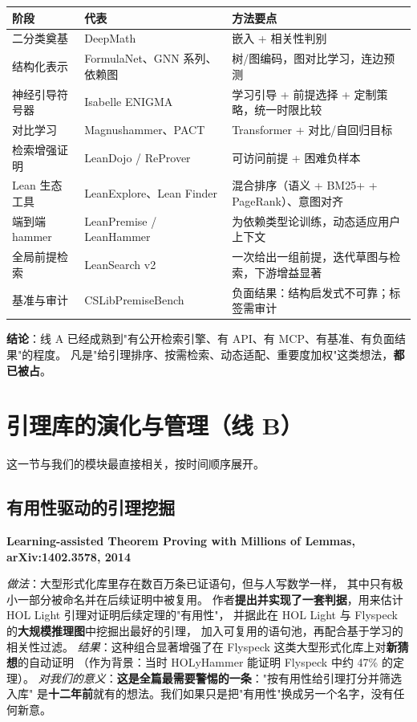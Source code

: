 \documentclass[UTF8,a4paper,11pt,fontset=windows]{ctexart}
\newcommand{\paper}[1]{\par\medskip\noindent\textbf{\color{sgblue!80!black}#1}\par\nobreak\vspace{1pt}}
\newcommand{\field}[1]{\textit{#1}：}
\begin{document}
\begin{table}[htbp]
\centering
\footnotesize
\begin{tabularx}{\textwidth}{@{}p{3.5cm}p{4.2cm}Y@{}}
\toprule
\textbf{阶段} & \textbf{代表} & \textbf{方法要点} \\
\midrule
二分类奠基 & DeepMath & 嵌入 + 相关性判别 \\
\midrule
结构化表示 & FormulaNet、GNN 系列、依赖图 & 树/图编码，图对比学习，连边预测 \\
\midrule
神经引导符号器 & Isabelle ENIGMA & 学习引导 + 前提选择 + 定制策略，统一时限比较 \\
\midrule
对比学习 & Magnushammer、PACT & Transformer + 对比/自回归目标 \\
\midrule
检索增强证明 & LeanDojo / ReProver & 可访问前提 + 困难负样本 \\
\midrule
Lean 生态工具 & LeanExplore、Lean Finder & 混合排序（语义 + BM25+ + PageRank）、意图对齐 \\
\midrule
端到端 hammer & LeanPremise / LeanHammer & 为依赖类型论训练，动态适应用户上下文 \\
\midrule
全局前提检索 & LeanSearch v2 & 一次给出一组前提，迭代草图与检索，下游增益显著 \\
\midrule
基准与审计 & CSLibPremiseBench & 负面结果：结构启发式不可靠；标签需审计 \\
\bottomrule
\end{tabularx}
\end{table}

\textbf{结论}：线 A 已经成熟到"有公开检索引擎、有 API、有 MCP、有基准、有负面结果"的程度。
凡是"给引理排序、按需检索、动态适配、重要度加权"这类想法，\textbf{都已被占}。

\section{引理库的演化与管理（线 B）}

这一节与我们的模块最直接相关，按时间顺序展开。

\subsection{有用性驱动的引理挖掘}

\paper{Learning-assisted Theorem Proving with Millions of Lemmas, arXiv:1402.3578, 2014}
\field{做法}大型形式化库里存在数百万条已证语句，但与人写数学一样，
其中只有极小一部分被命名并在后续证明中被复用。
作者\textbf{提出并实现了一套判据}，用来估计 HOL Light 引理对证明后续定理的"有用性"，
并据此在 HOL Light 与 Flyspeck 的\textbf{大规模推理图}中挖掘出最好的引理，
加入可复用的语句池，再配合基于学习的相关性过滤。
\field{结果}这种组合显著增强了在 Flyspeck 这类大型形式化库上对\textbf{新猜想}的自动证明
（作为背景：当时 HOLyHammer 能证明 Flyspeck 中约 47\% 的定理）。
\field{对我们的意义}\textbf{这是全篇最需要警惕的一条}："按有用性给引理打分并筛选入库"
是\textbf{十二年前}就有的想法。我们如果只是把"有用性"换成另一个名字，没有任何新意。
\end{document}
